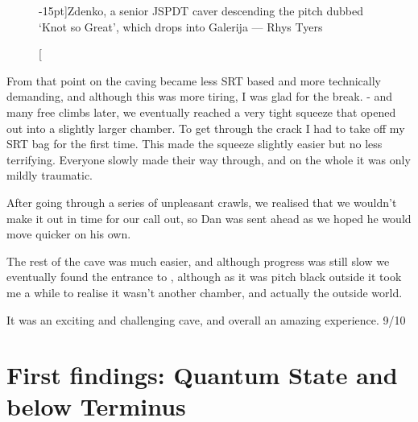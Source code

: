 \begin{figure}[t!]
\checkoddpage \ifoddpage \forcerectofloat \else \forceversofloat \fi
\centering
{}
\caption[][-15pt]{Zdenko, a senior JSPDT caver descending the pitch dubbed `Knot so Great', which drops into Galerija --- Rhys Tyers}
\label{Zdenko16}
\end{figure}
From that point on the caving became less SRT based and more technically demanding, and although this was more tiring, I was glad for the break. - and many free climbs later, we eventually reached a very tight squeeze that opened out into a slightly larger chamber. To get through the crack I had to take off my SRT bag for the first time. This made the squeeze slightly easier but no less terrifying. Everyone slowly made their way through, and on the whole it was only mildly traumatic.

After going through a series of unpleasant crawls, we realised that we wouldn't make it out in time for our call out, so Dan was sent ahead as we hoped he would move quicker on his own.

The rest of the cave was much easier, and although progress was still slow we eventually found the entrance to , although as it was pitch black outside it took me a while to realise it wasn't another chamber, and actually the outside world. 

It was an exciting and challenging cave, and overall an amazing experience. 9/10

\section{First findings: Quantum State and below Terminus}

